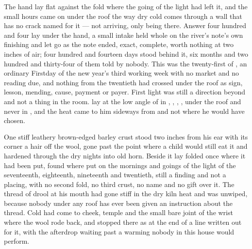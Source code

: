 
The hand lay flat against the fold where the going of the light had left it, and the small hours came on under the roof the way dry cold comes through a wall that has no crack named for it --- not arriving, only being there. Answer four hundred and four lay under the hand, a small intake held whole on the river's note's own finishing and let go as the note ended, exact, complete, worth nothing at two inches of air; four hundred and fourteen days stood behind it, six months and two hundred and thirty-four of them told by nobody. This was the twenty-first of , an ordinary Firstday of the new year's third working week with no market and no reading due, and nothing from the twentieth had crossed under the roof as sign, lesson, mending, cause, payment or payer. First light was still a direction beyond  and not a thing in the room.  lay at the low angle of  in , , , , under the roof and never in , and the heat came to him sideways from  and not where he would have chosen.

One stiff leathery brown-edged barley crust stood two inches from his ear with its corner a hair off the wool, gone past the point where a child would still eat it and hardened through the dry nights into old horn. Beside it  lay folded once where it had been put, found where put on the mornings and goings of the light of the seventeenth, eighteenth, nineteenth and twentieth, still a finding and not a placing, with no second fold, no third crust, no name and no gift over it. The thread of drool at his mouth had gone stiff in the dry kiln heat and was unwiped, because nobody under any roof has ever been given an instruction about the thread. Cold had come to cheek, temple and the small bare joint of the wrist where the wool rode back, and stopped there as at the end of a line written out for it, with the afterdrop waiting past a warming nobody in this house would perform.


